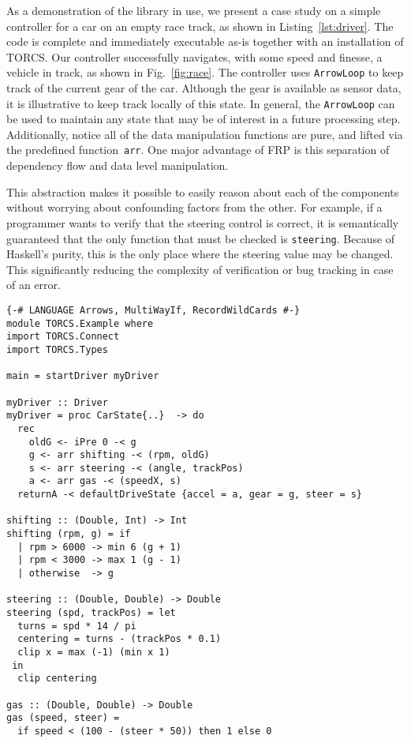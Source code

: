 As a demonstration of the \ourLib library in use, we present a case study on a simple controller for a car on an empty race track, as shown in Listing~\ref{lst:driver}. 
The code is complete and immediately executable as-is together with an installation of TORCS.
Our controller successfully navigates, with some speed and finesse, a vehicle in track, as shown in Fig.~\ref{fig:race}.
The controller uses \texttt{ArrowLoop} to keep track of the current gear of the car.
Although the gear is available as sensor data, it is illustrative to keep track locally of this state.
In general, the \texttt{ArrowLoop} can be used to maintain any state that may be of interest in a future processing step.
Additionally, notice all of the data manipulation functions are pure, and lifted via the predefined function~\texttt{arr}.
One major advantage of FRP is this separation of dependency flow and data level manipulation. 

This abstraction makes it possible to easily reason about each of the components without worrying about confounding factors from the other.
For example, if a programmer wants to verify that the steering control is correct, it is semantically guaranteed that the only function that must be checked is \texttt{steering}.
Because of Haskell's purity, this is the only place where the steering value may be changed. This significantly reducing the complexity of verification or bug tracking in case of an error.

\begin{lstlisting}[float,floatplacement=TR,caption=A complete basic controller in Yampa, label=lst:driver]
{-# LANGUAGE Arrows, MultiWayIf, RecordWildCards #-}
module TORCS.Example where
import TORCS.Connect
import TORCS.Types

main = startDriver myDriver

myDriver :: Driver
myDriver = proc CarState{..}  -> do
  rec 
    oldG <- iPre 0 -< g
    g <- arr shifting -< (rpm, oldG)
    s <- arr steering -< (angle, trackPos)
    a <- arr gas -< (speedX, s)
  returnA -< defaultDriveState {accel = a, gear = g, steer = s}

shifting :: (Double, Int) -> Int
shifting (rpm, g) = if 
  | rpm > 6000 -> min 6 (g + 1)
  | rpm < 3000 -> max 1 (g - 1)
  | otherwise  -> g
 
steering :: (Double, Double) -> Double
steering (spd, trackPos) = let
  turns = spd * 14 / pi
  centering = turns - (trackPos * 0.1)
  clip x = max (-1) (min x 1)
 in
  clip centering

gas :: (Double, Double) -> Double
gas (speed, steer) = 
  if speed < (100 - (steer * 50)) then 1 else 0
\end{lstlisting}

